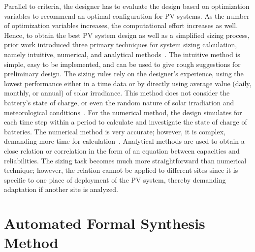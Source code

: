 \documentclass[journal]{IEEEtran}
\begin{document}
Parallel to criteria, the designer has to evaluate the design based on optimization variables to recommend an optimal configuration for PV systems. As the number of optimization variables increases, the computational effort increases as well. Hence, to obtain the best PV system design as well as a simplified sizing process, prior work introduced three primary techniques for system sizing calculation, namely intuitive, numerical, and analytical methods~\cite{Zhou2010}. The intuitive method is simple, easy to be implemented, and can be used to give rough suggestions for preliminary design. The sizing rules rely on the designer's experience, using the lowest performance either in a time data or by directly using average value (daily, monthly, or annual) of solar irradiance. This method does not consider the battery's state of charge, or even the random nature of solar irradiation and meteorological conditions~\cite{Alsadi2018}. For the numerical method, the design simulates for each time step within a period to calculate and investigate the state of charge of batteries. The numerical method is very accurate; however, it is complex, demanding more time for calculation~\cite{Park2004}. Analytical methods are used to obtain a close relation or correlation in the form of an equation between capacities and reliabilities. The sizing task becomes much more straightforward than numerical technique; however, the relation cannot be applied to different sites since it is specific to one place of deployment of the PV system, thereby demanding adaptation if another site is analyzed.

\section{Automated Formal Synthesis Method}
\label{sec:Method}
\end{document}
